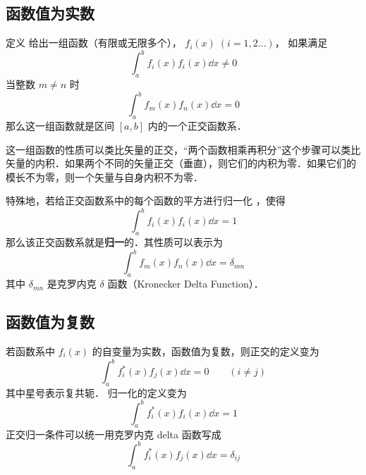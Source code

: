
\subsection{函数值为实数}

定义
给出一组函数（有限或无限多个）， $f_i(x)\; (i = 1,2\dots)$， 如果满足
\begin{equation}
\int_a^b f_i(x) f_i(x) \dd{x} \ne 0
\end{equation} 
当整数 $m \ne n$ 时
\begin{equation}
\int_a^b f_m(x) f_n(x) \dd{x} = 0
\end{equation} 
那么这一组函数就是区间 $[a,b]$ 内的一个正交函数系．

这一组函数的性质可以类比矢量的正交，“两个函数相乘再积分”这个步骤可以类比矢量的内积．如果两个不同的矢量正交（垂直），则它们的内积为零．如果它们的模长不为零，则一个矢量与自身内积不为零．

特殊地，若给正交函数系中的每个函数的平方进行归一化%
，使得
\begin{equation}
\int_a^b f_i(x) f_i(x) \dd{x} = 1
\end{equation} 
那么该正交函数系就是\textbf{归一}的．其性质可以表示为
 \begin{equation}
\int_a^b f_m(x) f_n(x) \dd{x} = \delta_{mn}
\end{equation} 
其中 $\delta_{mn}$ 是克罗内克 $\delta$ 函数（Kronecker Delta Function）．


\subsection{函数值为复数}

若函数系中 $f_i(x)$ 的自变量为实数，函数值为复数，则正交的定义变为
 \begin{equation}
\int_a^b f_i^*(x) f_j(x) \dd{x} = 0 \qquad ( i \ne j )
\end{equation}    
其中星号表示复共轭． 归一化的定义变为
 \begin{equation}
\int_a^b f_i^*(x) f_i(x) \dd{x} = 1
\end{equation} 
正交归一条件可以统一用克罗内克 delta 函数写成
 \begin{equation}
\int_a^b f_i^*(x) f_j(x) \dd{x} = \delta_{ij}
\end{equation}
